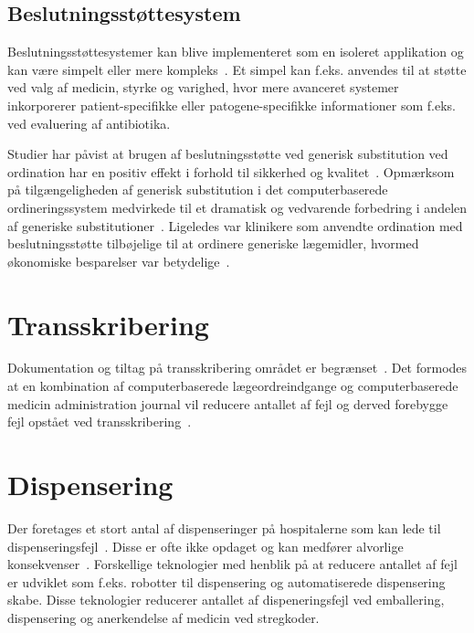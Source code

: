 \subsection{Beslutningsstøttesystem}
Beslutningsstøttesystemer kan blive implementeret som en isoleret applikation og kan være simpelt eller mere kompleks~\citep{Kaushal2002}. Et simpel kan f.eks. anvendes til at støtte ved valg af medicin, styrke og varighed, hvor mere avanceret systemer inkorporerer patient-specifikke eller patogene-specifikke informationer som f.eks. ved evaluering af antibiotika.~\citep{Kaushal2002}

Studier har påvist at brugen af beslutningsstøtte ved generisk substitution ved ordination har en positiv effekt i forhold til sikkerhed og kvalitet~\citep{Stenner2010, Fischer2008}. Opmærksom på tilgængeligheden af generisk substitution i det computerbaserede ordineringssystem medvirkede til et dramatisk og vedvarende forbedring i andelen af generiske substitutioner~\citep{Stenner2010}. Ligeledes var klinikere som anvendte ordination med beslutningsstøtte tilbøjelige til at ordinere generiske lægemidler, hvormed økonomiske besparelser var betydelige~\citep{Fischer2008}. %

\section{Transskribering}
Dokumentation og tiltag på transskribering området er begrænset~\citep{Kaushal2002}. Det formodes at en kombination af computerbaserede lægeordreindgange og computerbaserede medicin administration journal vil reducere antallet af fejl og derved forebygge fejl opstået ved transskribering~\citep{Kaushal2002}.

\section{Dispensering}
Der foretages et stort antal af dispenseringer på hospitalerne som kan lede til dispenseringsfejl~\citep{Agrawal2009}. Disse er ofte ikke opdaget og kan medfører alvorlige konsekvenser~\citep{Simpson2008}. Forskellige teknologier med henblik på at reducere antallet af fejl  er udviklet som f.eks. robotter til dispensering og automatiserede dispensering skabe. Disse teknologier reducerer antallet af dispeneringsfejl ved emballering, dispensering og anerkendelse af medicin ved stregkoder.~\citep{Agrawal2009}

